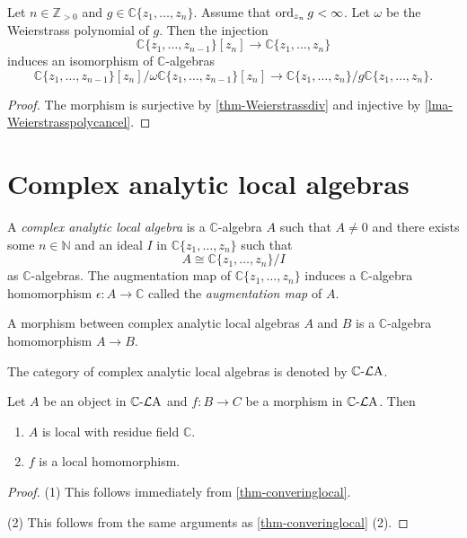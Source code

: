 \begin{corollary}
    Let $n\in \mathbb{Z}_{>0}$ and $g\in \mathbb{C}\{ z_1,\ldots,z_{n}\}$. Assume that $\operatorname{ord}_{z_n}g<\infty$. Let $\omega$ be the Weierstrass polynomial of $g$. Then the injection
    \[
        \mathbb{C}\{ z_1,\ldots,z_{n-1}\}[z_n]\rightarrow \mathbb{C}\{ z_1,\ldots,z_{n}\}
    \]
    induces an isomorphism of $\mathbb{C}$-algebras
    \[
        \mathbb{C}\{ z_1,\ldots,z_{n-1}\}[z_n]/\omega\mathbb{C}\{ z_1,\ldots,z_{n-1}\}[z_n]\rightarrow \mathbb{C}\{ z_1,\ldots,z_{n}\}/g\mathbb{C}\{ z_1,\ldots,z_{n}\}.
    \]
\end{corollary}
\begin{proof}
    The morphism is surjective by \cref{thm-Weierstrassdiv} and injective by \cref{lma-Weierstrasspolycancel}.
\end{proof}



\section{Complex analytic local algebras}

\begin{definition}\label{def-complexanalylocaalg}
    A \emph{complex analytic local algebra} is a $\mathbb{C}$-algebra $A$ such that $A\neq 0$ and there exists some $n\in \mathbb{N}$ and an ideal $I$ in $\mathbb{C}\{ z_1,\ldots,z_n \}$ such that 
    \[
        A\cong \mathbb{C}\{ z_1,\ldots,z_n \}/I
    \]
    as $\mathbb{C}$-algebras. 
    The augmentation map of $\mathbb{C}\{ z_1,\ldots,z_n \}$ induces a $\mathbb{C}$-algebra homomorphism $\epsilon:A\rightarrow \mathbb{C}$ called the \emph{augmentation map} of $A$.

    A morphism between complex analytic local algebras $A$ and $B$ is a $\mathbb{C}$-algebra homomorphism $A\rightarrow B$.

    The category of complex analytic local algebras is denoted by $\mathbb{C}\text{-}\mathcal{L}\mathrm{A}$.

\end{definition}

\begin{proposition}\label{prop-converinglocalgeneral}
    Let $A$ be an object in $\mathbb{C}\text{-}\mathcal{L}\mathrm{A}$ and $f:B\rightarrow C$ be a morphism in  $\mathbb{C}\text{-}\mathcal{L}\mathrm{A}$. Then
    \begin{enumerate}
        \item $A$ is local with residue field $\mathbb{C}$.
        \item $f$ is a local homomorphism.
    \end{enumerate}
\end{proposition}
\begin{proof}
    (1) This follows immediately from \cref{thm-converinglocal}.
    
    (2) This follows from the same arguments as \cref{thm-converinglocal} (2).
\end{proof}




